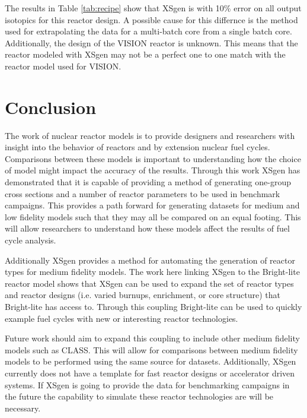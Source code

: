 \documentclass{article}
\begin{document}
The results in Table \ref{tab:recipe} show that XSgen is with 10\% error on all output isotopics for this reactor design. A possible cause for this differnce is the method used for extrapolating the data for a multi-batch core from a single batch core. Additionally, the design of the VISION reactor is unknown. This means that the reactor modeled with XSgen may not be a perfect one to one match with the reactor model used for VISION.

\section{Conclusion}
The work of nuclear reactor models is to provide designers and researchers with insight into the behavior of reactors and by extension nuclear fuel cycles. Comparisons between these models is important to understanding how the choice of model might impact the accuracy of the results. Through this work XSgen has demonstrated that it is capable of providing a method of generating one-group cross sections and a number of reactor parameters to be used in benchmark campaigns. This provides a path forward for generating datasets for medium and low fidelity models such that they may all be compared on an equal footing. This will allow researchers to understand how these models affect the results of fuel cycle analysis.

Additionally XSgen provides a method for automating the generation of reactor types for medium fidelity models. The work here linking XSgen to the Bright-lite reactor model shows that XSgen can be used to expand the set of reactor types and reactor designs (i.e. varied burnups, enrichment, or core structure) that Bright-lite has access to. Through this coupling Bright-lite can be used to quickly example fuel cycles with new or interesting reactor technologies.

Future work should aim to expand this coupling to include other medium fidelity models such as CLASS. This will allow for comparisons between medium fidelity models to be performed using the same source for datasets. Additionally, XSgen currently does not have a template for fast reactor designs or accelerator driven systems. If XSgen is going to provide the data for benchmarking campaigns in the future the capability to simulate these reactor technologies are will be necessary.




\end{document}
